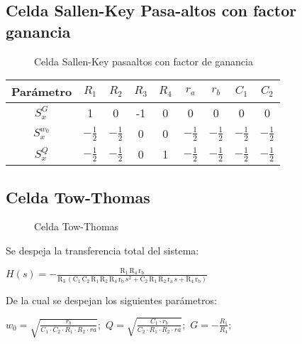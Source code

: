 \documentclass[../tc_tpfinal_main.tex]{subfiles}
\begin{document}
\subsection{Celda Sallen-Key Pasa-altos con factor ganancia}


\begin{figure}[H]
	\centering
	
	\caption{Celda Sallen-Key pasaaltos con factor de ganancia}
	\label{fig:sk_hp_gain_schem}
\end{figure}
\begin{table}[H] %
	\centering
	\begin{tabular}{||c c c c c c c c c||} 
 		\hline
	  	Parámetro& $R_1$ & $R_2$ & $R_3$ & $R_4$ & $r_a$ & $r_b$&$C_1$&$C_2$\\ [0.5ex] 
 		\hline\hline
		$S^G_x$& 1 & 0& -1& 0&0&0&0&0\\
		$S^{w_0}_x$& $- \frac{1}{2}$ &$- \frac{1}{2}$& 0& 0&$- \frac{1}{2}$&$- \frac{1}{2}$&$- \frac{1}{2}$&$- \frac{1}{2}$\\
		$S^{Q}_x$&$- \frac{1}{2}$ &$- \frac{1}{2}$& 0& 1&$- \frac{1}{2}$&$- \frac{1}{2}$&$- \frac{1}{2}$&$- \frac{1}{2}$\\[1ex] 
		\hline
	\end{tabular}
\end{table}
\subsection{Celda Tow-Thomas}

\begin{figure}[H]	
	\centering
	
	\caption{Celda Tow-Thomas}
	\label{fig:tpfinal_tow_thomas_circ}
\end{figure}

Se despeja la transferencia total del sistema:\par
\begin{center}
$H(s) = -\frac{\mathrm{R_1}\, \mathrm{R_4}\, \mathrm{r_b}}{\mathrm{R_3}\, \left(\mathrm{C_1}\, \mathrm{C_2}\, \mathrm{R_1}\, \mathrm{R_2}\, \mathrm{R_4}\, \mathrm{r_b}\, s^2 + \mathrm{C_2}\, \mathrm{R_1}\, \mathrm{R_2}\, \mathrm{r_a}\, s + \mathrm{R_4}\, \mathrm{r_b}\right)}
$
\end{center}

De la cual se despejan los siguientes parámetros:\par

\begin{center}
$w_0 = \sqrt{\frac{r_b}{C_1\cdot C_2\cdot R_1\cdot R_2\cdot ra}}; $
$Q = \sqrt{\frac{C_1\cdot r_b}{C_2\cdot R_1\cdot R_2\cdot ra}}; $
$G = -\frac{R_1}{R_4}; $ 
\end{center}
\end{document}
